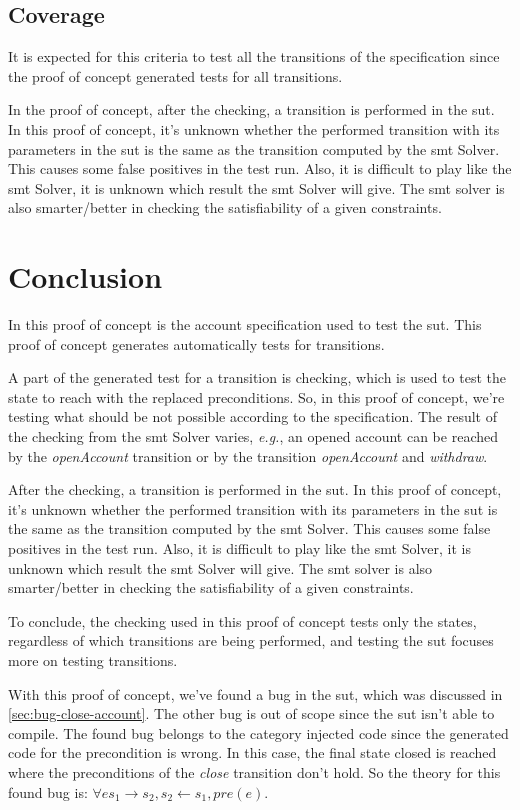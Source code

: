 \subsection{Coverage}
It is expected for this criteria to test all the transitions of the
specification since the proof of concept generated tests for all transitions.

In the proof of concept, after the checking, a transition
is performed in the \gls{sut}. In this proof of concept, it's unknown whether the
performed transition with its parameters in the \gls{sut} is the same as the
transition computed by the \gls{smt} Solver. This causes some false positives in the
test run. Also, it is difficult to play like the \gls{smt} Solver, it is unknown which
result the \gls{smt} Solver will give. The \gls{smt} solver is also smarter/better in checking
the satisfiability of a given constraints.

\section{Conclusion}
In this proof of concept is the account specification used to test the \gls{sut}.
This proof of concept generates automatically tests for transitions.

A part of
the generated test for a transition is checking, which is used to test the state to
reach with the replaced preconditions. So, in this proof of concept, we're
testing what should be not possible according to the specification. The result
of the checking from the \gls{smt} Solver varies, \textit{e.g.}, an opened account can be
reached by the \textit{openAccount} transition or by the transition
\textit{openAccount} and \textit{withdraw}.

After the checking, a transition
is performed in the \gls{sut}. In this proof of concept, it's unknown whether the
performed transition with its parameters in the \gls{sut} is the same as the
transition computed by the \gls{smt} Solver. This causes some false positives in the
test run. Also, it is difficult to play like the \gls{smt} Solver, it is unknown which
result the \gls{smt} Solver will give. The \gls{smt} solver is also smarter/better in checking
the satisfiability of a given constraints.

To conclude, the checking used in this proof of concept tests only the states, regardless of which transitions are
being performed, and testing the \gls{sut} focuses more on testing transitions.

With this proof of concept, we've found a bug in the \gls{sut}, which was
discussed in \autoref{sec:bug-close-account}. The other bug is out of scope
since the \gls{sut} isn't able to compile. The found bug belongs to the category
injected code since the generated code for the precondition is wrong. In this
case, the final state closed is reached where the preconditions of the \textit{close}
transition don't hold. So the theory for this found bug is:
$\forall e s_{1} \to s_{2}, s_{2} \gets s_{1}, pre(e)$.

